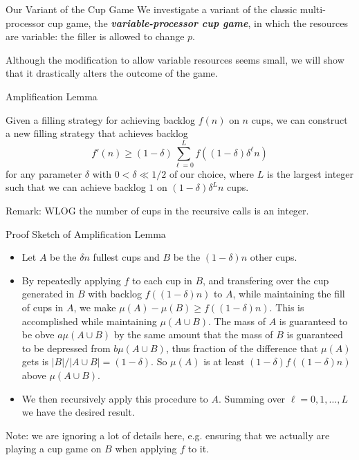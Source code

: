 \documentclass[xcolor=x11names, svgnames, rgb]{beamer}
\newcommand{\defn}[1]       {{\textit{\textbf{\boldmath #1}}}}
\begin{document}
\begin{frame}[t]{Our Variant of the Cup Game}
We investigate a variant of the classic multi-processor cup game,
the \defn{variable-processor cup game}, in which the resources are variable:
the filler is allowed to change $p$.

\vspace{1cm}
Although the modification to allow variable resources seems small, we will
show that it drastically alters the outcome of the game.
\end{frame}

\begin{frame}[t]{Amplification Lemma}
  \begin{lemma}
    Given a filling strategy for achieving backlog $f(n)$ on $n$ cups, we can construct a new filling strategy that achieves backlog 
    $$f'(n) \ge (1-\delta)\sum_{\ell=0}^L f((1-\delta)\delta^\ell n)$$
    for any parameter $\delta$ with $0 < \delta \ll 1/2$ of our choice, where $L$
    is the largest integer such that we can achieve backlog $1$ on
    $(1-\delta)\delta^Ln$ cups.%
  \end{lemma}
  Remark: WLOG the number of cups in the recursive calls is an integer.
  
\end{frame}

\begin{frame}[t]{Proof Sketch of Amplification Lemma}
  \begin{itemize}
    \item Let $A$ be the $\delta n$ fullest cups and $B$ be the $(1-\delta)n$ other cups.
    \item By repeatedly applying $f$ to each cup in $B$, and transfering over
      the cup generated in $B$ with backlog $f((1-\delta)n)$ to $A$, while maintaining the fill of cups in $A$, we make
      $\mu (A) - \mu (B) \ge f((1-\delta)n)$. This is accomplished while
      maintaining $\mu(A\cup B)$. The mass of $A$ is guaranteed to be obve
      $a\mu(A\cup B)$ by the same amount that the mass of $B$ is guaranteed to
      be depressed from $b\mu(A\cup B)$, thus fraction of the difference that
      $\mu(A)$ gets is $|B|/|A\cup B| = (1-\delta)$. So $\mu(A)$ is at least
      $(1-\delta)f((1-\delta)n)$ above $\mu(A\cup B)$.
    \item We then recursively apply this procedure to $A$. Summing over $\ell = 0,1, \ldots, L$ we have the desired result.
  \end{itemize} 

  Note: we are ignoring a lot of details here, e.g. ensuring that we actually are playing a cup game on $B$ when applying $f$ to it.
\end{frame}
\end{document}
